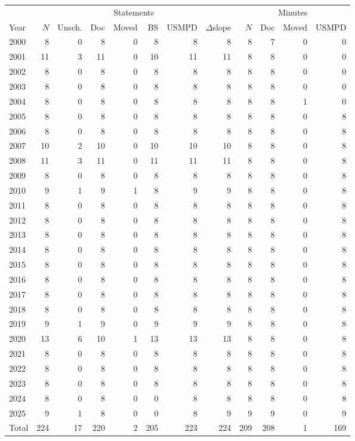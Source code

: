 \begin{tabular}{l rrrrrrr rrrr}
\toprule
 & \multicolumn{7}{c}{Statements} & \multicolumn{4}{c}{Minutes} \\
\cmidrule(lr){2-8}\cmidrule(lr){9-12}
Year & $N$ & Unsch. & Doc & Moved & BS & USMPD & $\Delta$slope & $N$ & Doc & Moved & USMPD \\
\midrule
2000 & 8 & 0 & 8 & 0 & 8 & 8 & 8 & 8 & 7 & 0 & 0 \\
2001 & 11 & 3 & 11 & 0 & 10 & 11 & 11 & 8 & 8 & 0 & 0 \\
2002 & 8 & 0 & 8 & 0 & 8 & 8 & 8 & 8 & 8 & 0 & 0 \\
2003 & 8 & 0 & 8 & 0 & 8 & 8 & 8 & 8 & 8 & 0 & 0 \\
2004 & 8 & 0 & 8 & 0 & 8 & 8 & 8 & 8 & 8 & 1 & 0 \\
2005 & 8 & 0 & 8 & 0 & 8 & 8 & 8 & 8 & 8 & 0 & 8 \\
2006 & 8 & 0 & 8 & 0 & 8 & 8 & 8 & 8 & 8 & 0 & 8 \\
2007 & 10 & 2 & 10 & 0 & 10 & 10 & 10 & 8 & 8 & 0 & 8 \\
2008 & 11 & 3 & 11 & 0 & 11 & 11 & 11 & 8 & 8 & 0 & 8 \\
2009 & 8 & 0 & 8 & 0 & 8 & 8 & 8 & 8 & 8 & 0 & 8 \\
2010 & 9 & 1 & 9 & 1 & 8 & 9 & 9 & 8 & 8 & 0 & 8 \\
2011 & 8 & 0 & 8 & 0 & 8 & 8 & 8 & 8 & 8 & 0 & 8 \\
2012 & 8 & 0 & 8 & 0 & 8 & 8 & 8 & 8 & 8 & 0 & 8 \\
2013 & 8 & 0 & 8 & 0 & 8 & 8 & 8 & 8 & 8 & 0 & 8 \\
2014 & 8 & 0 & 8 & 0 & 8 & 8 & 8 & 8 & 8 & 0 & 8 \\
2015 & 8 & 0 & 8 & 0 & 8 & 8 & 8 & 8 & 8 & 0 & 8 \\
2016 & 8 & 0 & 8 & 0 & 8 & 8 & 8 & 8 & 8 & 0 & 8 \\
2017 & 8 & 0 & 8 & 0 & 8 & 8 & 8 & 8 & 8 & 0 & 8 \\
2018 & 8 & 0 & 8 & 0 & 8 & 8 & 8 & 8 & 8 & 0 & 8 \\
2019 & 9 & 1 & 9 & 0 & 9 & 9 & 9 & 8 & 8 & 0 & 8 \\
2020 & 13 & 6 & 10 & 1 & 13 & 13 & 13 & 8 & 8 & 0 & 8 \\
2021 & 8 & 0 & 8 & 0 & 8 & 8 & 8 & 8 & 8 & 0 & 8 \\
2022 & 8 & 0 & 8 & 0 & 8 & 8 & 8 & 8 & 8 & 0 & 8 \\
2023 & 8 & 0 & 8 & 0 & 8 & 8 & 8 & 8 & 8 & 0 & 8 \\
2024 & 8 & 0 & 8 & 0 & 0 & 8 & 8 & 8 & 8 & 0 & 8 \\
2025 & 9 & 1 & 8 & 0 & 0 & 8 & 9 & 9 & 9 & 0 & 9 \\
\midrule
Total & 224 & 17 & 220 & 2 & 205 & 223 & 224 & 209 & 208 & 1 & 169 \\
\bottomrule
\end{tabular}
